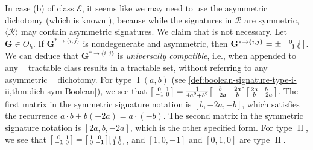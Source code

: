 \documentclass[11pt]{article}
\DeclareMathOperator{\holbs}{Holant^*_2}
\DeclareMathOperator{\typei}{I}
\DeclareMathOperator{\typeii}{II}
\newcommand{\octgroup}{O_h}
\newcommand{\domres}[1]{
  ^{*\to\{#1\}}
}
\newcommand{\tractBGGRBR}{$\mathscr{E}$\xspace}
\begin{document}
In case (b) of class \tractBGGRBR, it seems like we may need to use the asymmetric $\holbs$ dichotomy  (which is known \cite{cai_dichotomy_2020_asymm}), because while the signatures in $\mathcal{R}$ are symmetric, $\langle \mathcal{R} \rangle$ may contain asymmetric signatures.
We claim that is not necessary.
Let $\mathbf{G} \in \octgroup$.
If $\mathbf{G}\domres{i, j}$ is nondegenerate and asymmetric, then $\mathbf{G}\domres{i, j} = \pm \begin{bsmallmatrix}
  0 & 1 \\
  -1 & 0
\end{bsmallmatrix}$.
We can deduce that $\mathbf{G}\domres{i, j}$ is \emph{universally compatible}, i.e., when appended to
any $\holbs$ tractable class results in a tractable set, without referring to any asymmetric $\holbs$ dichotomy.
For type $\typei(a, b)$ (see \cref{def:boolean-signature-type-i-ii,thm:dich-sym-Boolean}), we see that $\begin{bsmallmatrix}
  0 & 1 \\ -1 & 0
\end{bsmallmatrix} = \frac{1}{4a^2 + b^2} \begin{bsmallmatrix}
  b & - 2a \\
  - 2a & -b
\end{bsmallmatrix} \begin{bsmallmatrix}
  2a & b \\
  b & - 2a
\end{bsmallmatrix}$.
The first matrix in the symmetric signature notation is $[b, -2a, -b]$, which satisfies the recurrence $a \cdot b + b (-2a) = a  \cdot (-b)$.
The second matrix in the symmetric signature notation is $[2a, b, -2a]$, which is the other specified form.
For type $\typeii$, we see that $\begin{bsmallmatrix}
  0 & 1 \\
  -1 & 0
\end{bsmallmatrix} = \begin{bsmallmatrix}
  1 & 0 \\ 0 & -1
\end{bsmallmatrix} \begin{bsmallmatrix}
  0 & 1 \\ 1 & 0
\end{bsmallmatrix}$, and $[1, 0, -1]$  and $[0, 1, 0]$ are type $\typeii$.
\end{document}
